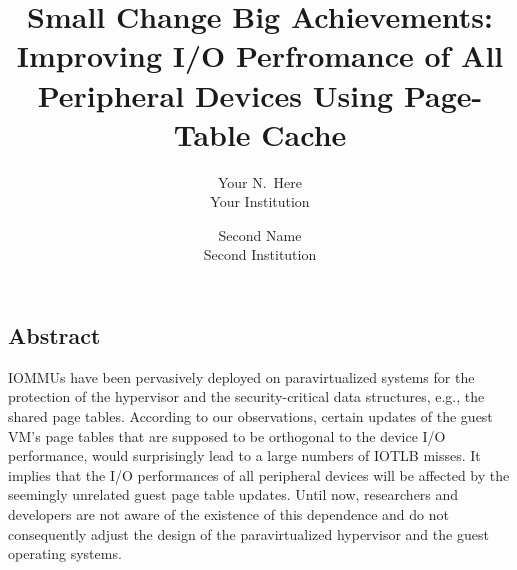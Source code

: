 \documentclass[letterpaper,twocolumn,10pt]{article}
\begin{document}
\newcommand{\name}{IOSUP\xspace}
\newcommand{\eat}[1]{}  %
\newcommand{\authcomment}[3]{\textcolor{#3}{#1 says: #2}}\newcommand{\yueqiang}[1]{\authcomment{Yueqiang}{#1}{red}}
\newcommand{\zhi}[1]{\authcomment{Zhi}{#1}{red}}



\date{}

\title{\Large \bf Small Change Big Achievements: Improving I/O Perfromance of All Peripheral Devices Using Page-Table Cache}

\author{
{\rm Your N.\ Here}\\
Your Institution
\and
{\rm Second Name}\\
Second Institution
} %

\maketitle

\thispagestyle{empty}


\subsection*{Abstract}

IOMMUs have been pervasively deployed on paravirtualized systems for the protection of the hypervisor and the security-critical data structures, e.g., the shared page tables. According to our observations, certain updates of the guest VM's page tables that are supposed to be orthogonal to the device I/O performance, would surprisingly lead to a large numbers of IOTLB misses. It implies that the I/O performances of all peripheral devices will be affected by the seemingly unrelated guest page table updates. Until now, researchers and developers are not aware of the existence of this dependence and do not consequently adjust the design of the paravirtualized hypervisor and the guest operating systems.
\end{document}
